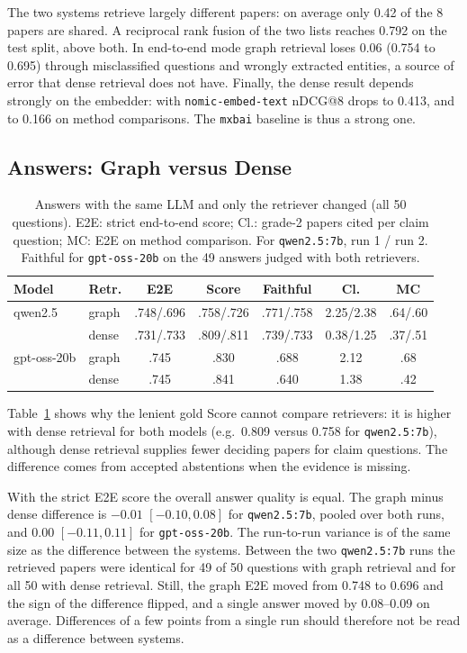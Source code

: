 The two systems retrieve largely different papers: on average only 0.42 of the
8 papers are shared. A reciprocal rank fusion of the two lists reaches 0.792 on
the test split, above both. In end-to-end mode graph retrieval loses 0.06
(0.754 to 0.695) through misclassified questions and wrongly extracted entities,
a source of error that dense retrieval does not have. Finally, the dense result
depends strongly on the embedder: with \texttt{nomic-embed-text} nDCG@8 drops to
0.413, and to 0.166 on method comparisons. The \texttt{mxbai} baseline is thus a
strong one.

\subsection{Answers: Graph versus Dense}

\begin{table}[t]
\caption{Answers with the same LLM and only the retriever changed (all 50 questions). E2E: strict end-to-end score; Cl.: grade-2 papers cited per claim question; MC: E2E on method comparison. For \texttt{qwen2.5:7b}, run 1 / run 2. Faithful for \texttt{gpt-oss-20b} on the 49 answers judged with both retrievers.}
\label{tab:answers}
\centering
\setlength{\tabcolsep}{2.5pt}
\begin{tabular}{llccccc}
\hline
Model & Retr. & E2E & Score & Faithful & Cl. & MC \\
\hline
qwen2.5 & graph & .748/.696 & .758/.726 & .771/.758 & 2.25/2.38 & .64/.60 \\
        & dense & .731/.733 & .809/.811 & .739/.733 & 0.38/1.25 & .37/.51 \\
gpt-oss-20b & graph & .745 & .830 & .688 & 2.12 & .68 \\
            & dense & .745 & .841 & .640 & 1.38 & .42 \\
\hline
\end{tabular}
\end{table}

Table~\ref{tab:answers} shows why the lenient gold Score cannot compare
retrievers: it is higher with dense retrieval for both models (e.g.\ 0.809
versus 0.758 for \texttt{qwen2.5:7b}), although dense retrieval supplies fewer
deciding papers for claim questions. The difference comes from accepted
abstentions when the evidence is missing.

With the strict E2E score the overall answer quality is equal. The graph minus
dense difference is $-0.01$ $[-0.10, 0.08]$ for \texttt{qwen2.5:7b}, pooled over
both runs, and $0.00$ $[-0.11, 0.11]$ for \texttt{gpt-oss-20b}. The run-to-run
variance is of the same size as the difference between the systems. Between the
two \texttt{qwen2.5:7b} runs the retrieved papers were identical for 49 of 50
questions with graph retrieval and for all 50 with dense retrieval. Still, the
graph E2E moved from 0.748 to 0.696 and the sign of the difference flipped, and
a single answer moved by 0.08--0.09 on average. Differences of a few points from
a single run should therefore not be read as a difference between systems.


